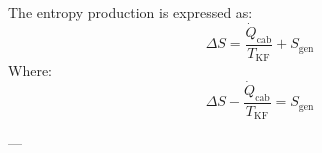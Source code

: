The entropy production is expressed as:  
\[
\Delta S = \frac{\dot{Q}_{\text{cab}}}{T_{\text{KF}}} + S_{\text{gen}}
\]  
Where:  
\[
\Delta S - \frac{\dot{Q}_{\text{cab}}}{T_{\text{KF}}} = S_{\text{gen}}
\]  

---